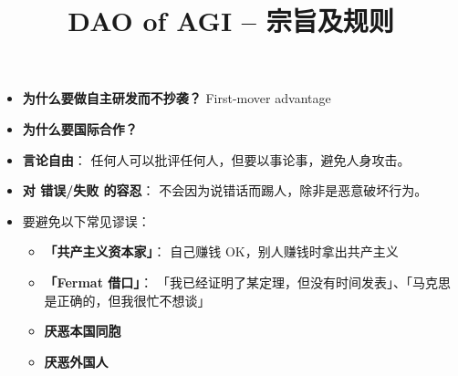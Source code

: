 \documentclass{article}
\title{DAO of AGI -- 宗旨及规则}
\date{\vspace{-8ex}}
\begin{document}
\maketitle

\begin{itemize}
	\item \textbf{为什么要做自主研发而不抄袭？} First-mover advantage
	
	\item \textbf{为什么要国际合作？}
	
	\item \textbf{言论自由}： 任何人可以批评任何人，但要以事论事，避免人身攻击。
	
	\item \textbf{对 错误/失败 的容忍}： 不会因为说错话而踢人，除非是恶意破坏行为。
	
	\item 要避免以下常见谬误：

	\begin{itemize}
		\item \textbf{「共产主义资本家」}： 自己赚钱 OK，别人赚钱时拿出共产主义

		\item \textbf{「Fermat 借口」}： 「我已经证明了某定理，但没有时间发表」、「马克思是正确的，但我很忙不想谈」
		
		\item \textbf{厌恶本国同胞}
		
		\item \textbf{厌恶外国人}

	\end{itemize}
		

\end{itemize}
\end{document}
